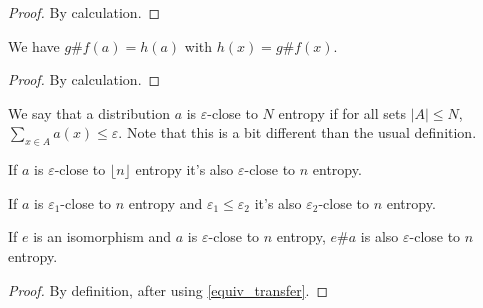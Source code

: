\begin{proof}
    \leanok
    By calculation.
\end{proof}

\begin{lemma}
    \label{linear_combination_apply}
    \leanok
    We have $g \# f(a) = h(a)$ with $h(x) = g\# f(x)$.
\end{lemma}

\begin{proof}
    \leanok
    By calculation.
\end{proof}

\begin{definition}
    \label{close_high_entropy}
    \leanok
    We say that a distribution $a$ is $\varepsilon$-close to $N$ entropy if for all sets $|A| \leq N$,
    $\sum_{x \in A} a(x) \leq \varepsilon$. Note that this is a bit different than the usual definition.
\end{definition}

\begin{proposition}
    \label{close_high_entropy_of_floor}
    \leanok
    If $a$ is $\varepsilon$-close to $\lfloor n \rfloor$ entropy it's also $\varepsilon$-close to $n$ entropy.
\end{proposition}

\begin{proposition}
    \label{close_high_entropy_of_le}
    \leanok
    If $a$ is $\varepsilon_1$-close to $n$ entropy and $\varepsilon_1 \leq \varepsilon_2$ it's also $\varepsilon_2$-close to $n$ entropy.
\end{proposition}

\begin{lemma}
    \label{close_high_entropy_apply_equiv}
    \leanok
    If $e$ is an isomorphism and $a$ is $\varepsilon$-close to $n$ entropy, $e \# a$ is also $\varepsilon$-close to $n$ entropy.
\end{lemma}

\begin{proof}
    \leanok
    By definition, after using \ref{equiv_transfer}.
\end{proof}

